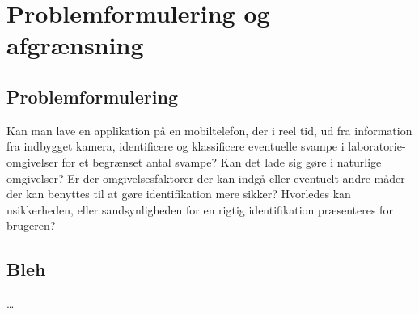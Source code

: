 
\chapter{Problemformulering og afgrænsning}

\section{Problemformulering}
Kan man lave en applikation på en mobiltelefon, der i reel tid, ud fra
information fra indbygget kamera, identificere og klassificere
eventuelle svampe i laboratorie-omgivelser for et begrænset antal
svampe? Kan det lade sig gøre i naturlige omgivelser? Er der
omgivelsesfaktorer der kan indgå eller eventuelt andre måder der kan
benyttes til at gøre identifikation mere sikker? Hvorledes kan
usikkerheden, eller sandsynligheden for en rigtig identifikation
præsenteres for brugeren?

\section{Bleh}
\ldots
